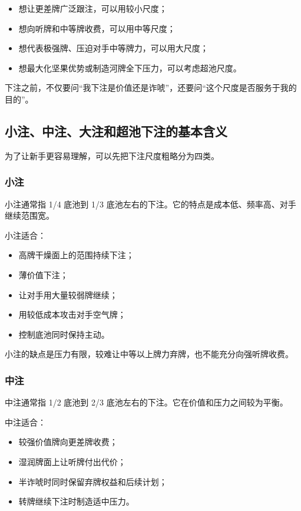 \begin{itemize}
\item 想让更差牌广泛跟注，可以用较小尺度；
\item 想向听牌和中等牌收费，可以用中等尺度；
\item 想代表极强牌、压迫对手中等牌力，可以用大尺度；
\item 想最大化坚果优势或制造河牌全下压力，可以考虑超池尺度。
\end{itemize}

下注之前，不仅要问“我下注是价值还是诈唬”，还要问“这个尺度是否服务于我的目的”。

\subsection{小注、中注、大注和超池下注的基本含义}

为了让新手更容易理解，可以先把下注尺度粗略分为四类。

\subsubsection*{小注}

小注通常指 1/4 底池到 1/3 底池左右的下注。它的特点是成本低、频率高、对手继续范围宽。

小注适合：

\begin{itemize}
\item 高牌干燥面上的范围持续下注；
\item 薄价值下注；
\item 让对手用大量较弱牌继续；
\item 用较低成本攻击对手空气牌；
\item 控制底池同时保持主动。
\end{itemize}

小注的缺点是压力有限，较难让中等以上牌力弃牌，也不能充分向强听牌收费。

\subsubsection*{中注}

中注通常指 1/2 底池到 2/3 底池左右的下注。它在价值和压力之间较为平衡。

中注适合：

\begin{itemize}
\item 较强价值牌向更差牌收费；
\item 湿润牌面上让听牌付出代价；
\item 半诈唬时同时保留弃牌权益和后续计划；
\item 转牌继续下注时制造适中压力。
\end{itemize}

